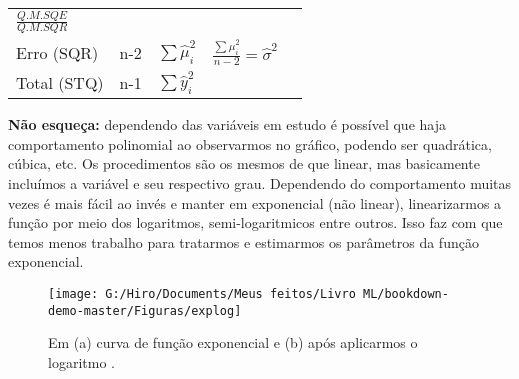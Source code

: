 \documentclass[
  openany]{book}
\begin{document}
\begin{longtable}[]{@{}lllll@{}}
\begin{minipage}[t]{0.17\columnwidth}
\(\frac{Q.M.SQE}{Q.M.SQR}\)\strut
\end{minipage}\tabularnewline
\begin{minipage}[t]{0.17\columnwidth}\raggedright
Erro (SQR)\strut
\end{minipage} & \begin{minipage}[t]{0.17\columnwidth}\raggedright
n-2\strut
\end{minipage} & \begin{minipage}[t]{0.17\columnwidth}\raggedright
\(\sum \hat{\mu}_i^2\)\strut
\end{minipage} & \begin{minipage}[t]{0.17\columnwidth}\raggedright
\(\frac{\sum \mu_i^2}{n-2}=\hat{\sigma}^2\)\strut
\end{minipage} & \begin{minipage}[t]{0.17\columnwidth}\raggedright
\strut
\end{minipage}\tabularnewline
\begin{minipage}[t]{0.17\columnwidth}\raggedright
Total (STQ)\strut
\end{minipage} & \begin{minipage}[t]{0.17\columnwidth}\raggedright
n-1\strut
\end{minipage} & \begin{minipage}[t]{0.17\columnwidth}\raggedright
\(\sum \hat{y}_i^2\)\strut
\end{minipage} & \begin{minipage}[t]{0.17\columnwidth}\raggedright
\strut
\end{minipage} & \begin{minipage}[t]{0.17\columnwidth}\raggedright
\strut
\end{minipage}\tabularnewline
\bottomrule
\end{longtable}

\textbf{Não esqueça:} dependendo das variáveis em estudo é possível que haja comportamento polinomial ao observarmos no gráfico, podendo ser quadrática, cúbica, etc. Os procedimentos são os mesmos de que linear, mas basicamente incluímos a variável e seu respectivo grau. Dependendo do comportamento muitas vezes é mais fácil ao invés e manter em exponencial (não linear), linearizarmos a função por meio dos logaritmos, semi-logaritmicos entre outros. Isso faz com que temos menos trabalho para tratarmos e estimarmos os parâmetros da função exponencial.

\begin{figure}

{\centering \texttt{[image: G:/Hiro/Documents/Meus feitos/Livro ML/bookdown-demo-master/Figuras/explog]} 

}

\caption{Em (a) curva de função exponencial e (b) após aplicarmos o logaritmo \citep{gujarati2011econometria}.}\label{fig:explog}
\end{figure}
\end{document}
